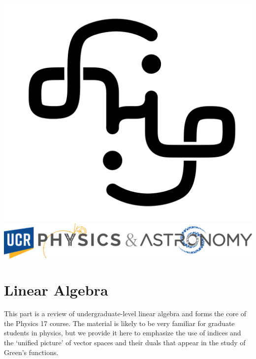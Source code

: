 \documentclass[12pt, oneside]{report}    %
\begin{document}
\noindent %

\vspace*{\fill}
\begin{center}
\includegraphics[height=.1\textwidth]{figures/FlipAmbigram.png}
\hspace{5em}
\includegraphics[height=.1\textwidth]{figures/UCRPnA_banner.png}
\end{center}

\newpage

\small
\setcounter{tocdepth}{2}
\tableofcontents
\normalsize
\clearpage
\restoregeometry        %








\part{Linear Algebra}

This part is a review of undergraduate-level linear algebra and forms the core of the Physics 17 course. The material is likely to be very familiar for graduate students in physics, but we provide it here to emphasize the use of indices and the `unified picture' of vector spaces and their duals that appear in the study of Green's functions.
















% 
\end{document}

